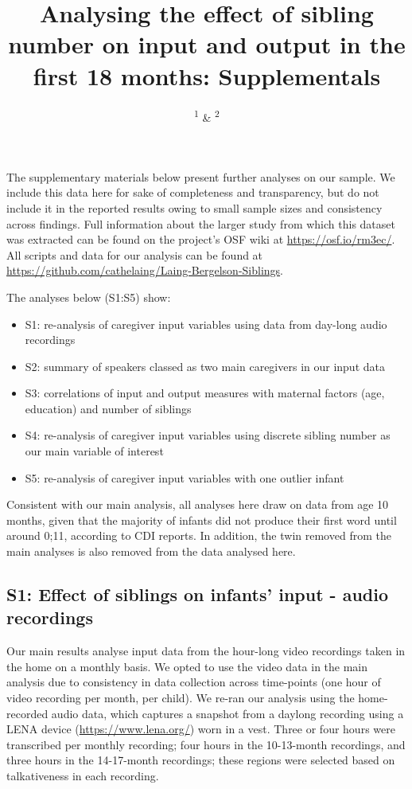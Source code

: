 \documentclass[
  man,mask,floatsintext]{apa6}
\title{Analysing the effect of sibling number on input and output in the first 18 months: Supplementals}
\author{\textsuperscript{1} \& \textsuperscript{2}}
\date{}
\affiliation{\vspace{0.5cm}\textsuperscript{1} \\\textsuperscript{2} }
\providecommand{\tightlist}{%
  \setlength{\itemsep}{0pt}\setlength{\parskip}{0pt}}
\begin{document}
\maketitle

The supplementary materials below present further analyses on our sample. We include this data here for sake of completeness and transparency, but do not include it in the reported results owing to small sample sizes and consistency across findings. Full information about the larger study from which this dataset was extracted can be found on the project's OSF wiki at \url{https://osf.io/rm3ec/}. All scripts and data for our analysis can be found at \url{https://github.com/cathelaing/Laing-Bergelson-Siblings}.

The analyses below (S1:S5) show:

\begin{itemize}
\tightlist
\item
  S1: re-analysis of caregiver input variables using data from day-long audio recordings\\
\item
  S2: summary of speakers classed as two main caregivers in our input data
\item
  S3: correlations of input and output measures with maternal factors (age, education) and number of siblings
\item
  S4: re-analysis of caregiver input variables using discrete sibling number as our main variable of interest
\item
  S5: re-analysis of caregiver input variables with one outlier infant
\end{itemize}

Consistent with our main analysis, all analyses here draw on data from age 10 months, given that the majority of infants did not produce their first word until around 0;11, according to CDI reports. In addition, the twin removed from the main analyses is also removed from the data analysed here.

\hypertarget{s1-effect-of-siblings-on-infants-input---audio-recordings}{%
\subsection{S1: Effect of siblings on infants' input - audio recordings}\label{s1-effect-of-siblings-on-infants-input---audio-recordings}}

Our main results analyse input data from the hour-long video recordings taken in the home on a monthly basis. We opted to use the video data in the main analysis due to consistency in data collection across time-points (one hour of video recording per month, per child). We re-ran our analysis using the home-recorded audio data, which captures a snapshot from a daylong recording using a LENA device (\url{https://www.lena.org/}) worn in a vest. Three or four hours were transcribed per monthly recording; four hours in the 10-13-month recordings, and three hours in the 14-17-month recordings; these regions were selected based on talkativeness in each recording.
\end{document}
